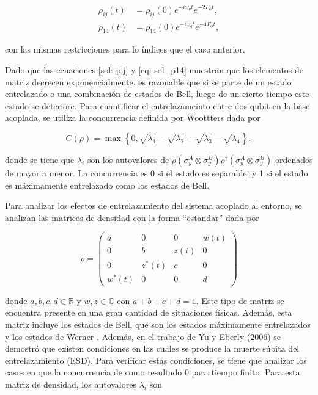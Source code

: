 \begin{align}
    \rho_{ij}(t) &= \rho_{ij}(0) e^{-i \omega_q t} e^{-2\Gamma_\phi t} \label{sol: pij}, \\
    \rho_{14}(t) &= \rho_{14}(0) e^{-i \omega_q t} e^{-4\Gamma_\phi t} \label{eq: sol_p14},
\end{align}

\noindent con las mismas restricciones para lo índices que el caso anterior.

Dado que las ecuaciones \ref{sol: pij} y \ref{eq: sol_p14} muestran que los elementos de matriz decrecen exponencialmente, es razonable que si se parte de un estado entrelazado o una combinación de estados de Bell, luego de un cierto tiempo este estado se deteriore. Para cuantificar el entrelazameinto entre dos qubit en la base acoplada, se utiliza la concurrencia definida por Woottters \cite{Wootters} dada por

\begin{equation}
    C(\rho) = \max \left\{0,\sqrt{\lambda_1}-\sqrt{\lambda_2}-\sqrt{\lambda_3}-\sqrt{\lambda_4}\right\},
\end{equation}


\noindent donde se tiene que \(\lambda_i\) son los autovalores de \(\rho(\sigma_y^A \otimes \sigma_y^B) \rho^\dagger (\sigma_y^A \otimes \sigma_y^B)\) ordenados de mayor a menor. La concurrencia es 0 si el estado es separable, y 1 si el estado es máximamente entrelazado como los estados de Bell.

Para analizar los efectos de entrelazamiento del sistema acoplado al entorno, se analizan las matrices de densidad con la forma ``estandar'' dada por

\begin{equation} \label{eq: rho_standar}
    \rho = \begin{pmatrix}
        a & 0 & 0 & w(t) \\
        0 & b & z(t) & 0 \\
        0 & z^*(t) & c & 0 \\
        w^*(t) & 0 & 0 & d
    \end{pmatrix}
\end{equation}

\noindent donde \(a,b,c,d \in \mathbb{R}\) y \(w,z \in \mathbb{C}\) con \(a+b+c+d = 1\). Este tipo de matriz se encuentra presente en una gran cantidad de situaciones físicas. Además, esta matriz incluye los estados de Bell, que son los estados máximamente entrelazados y los estados de Werner \cite{ESD}. Además, en el trabajo de Yu y Eberly (2006) \cite{ESD} se demostró que existen condiciones en las cuales se produce la muerte súbita del entrelazamiento (ESD). Para verificar estas condiciones, se tiene que analizar los casos en que la concurrencia de como resultado 0 para tiempo finito. Para esta matriz de densidad, los autovalores \(\lambda_i\) son

